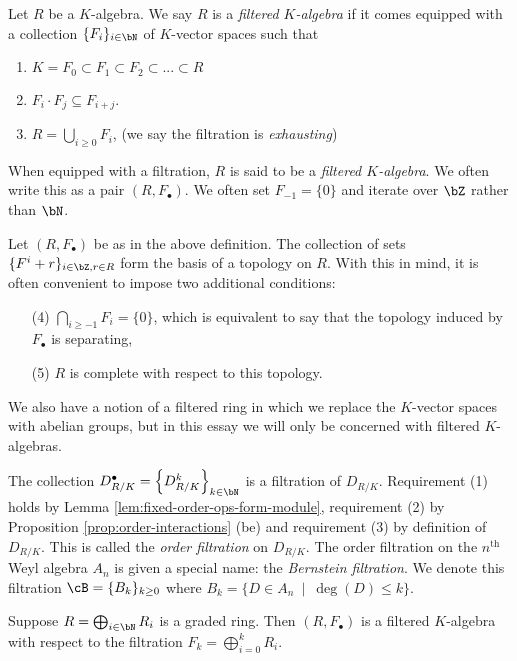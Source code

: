 \begin{defn}\label{defn:filtered-ring}
	Let $R$ be a $K$-algebra. We say $R$ is a \emph{filtered $K$-algebra} if it comes equipped with a collection $\{F_i\}_{i \in \bN}$ of $K$-vector spaces such that
	\begin{enumerate}[(1)]
		\item $K = F_0 \subset F_1 \subset F_2 \subset...\subset R$
		\item $F_i\cdot F_j \subseteq F_{i+j}$.
		\item $R = \bigcup_{i\geq 0} F_i$, (we say the filtration is \emph{exhausting})
	\end{enumerate}
	When equipped with a filtration, $R$ is said to be a \emph{filtered $K$-algebra}. We often write this as a pair $(R,F_\bullet)$. We often set $F_{-1} = \{0\}$ and iterate over $\bZ$ rather than $\bN$.
\end{defn}
\begin{rmk}\label{rmk:filtration-def-extension}
	Let $(R,F_\bullet)$ be as in the above definition. The collection of sets $\{F^i + r\}_{i \in \bZ, r\in R}$ form the basis of a topology on $R$. With this in mind, it is often convenient to impose two additional conditions:
	\begin{enumerate}[(1)]
		\item[(4)] $\bigcap_{i\geq -1}F_i = \{0\}$, which is equivalent to say that the topology induced by $F_\bullet$ is separating,
		\item[(5)] $R$ is complete with respect to this topology.
	\end{enumerate}
\end{rmk}
We also have a notion of a filtered ring in which we replace the $K$-vector spaces with abelian groups, but in this essay we will only be concerned with filtered $K$-algebras.
\begin{example}\label{example:order-filtration-Bernstein-filtration}
	The collection $D^\bullet_{R/K} = \left\{D^k_{R/K}\right\}_{k\in \bN}$ is a filtration of $D_{R/K}$. Requirement (1) holds by Lemma \ref{lem:fixed-order-ops-form-module}, requirement (2) by Proposition \ref{prop:order-interactions} (be) and requirement (3) by definition of $D_{R/K}$. This is called the \emph{order filtration} on $D_{R/K}$. The order filtration on the $n^{\text{th}}$ Weyl algebra $A_n$ is given a special name: the \emph{Bernstein filtration}. We denote this filtration $\cB = \{B_k\}_{k\geq 0}$ where $B_k = \{D \in A_n ~\mid~ \deg(D) \leq k\}$.
\end{example}
\begin{example}\label{example:graded-algebras-are-filtered}
	Suppose $R = \bigoplus_{i \in \bN} R_i$ is a graded ring. Then $(R,F_\bullet)$ is a filtered $K$-algebra with respect to the filtration $F_k = \bigoplus_{i=0}^k R_i$. 	
\end{example}
